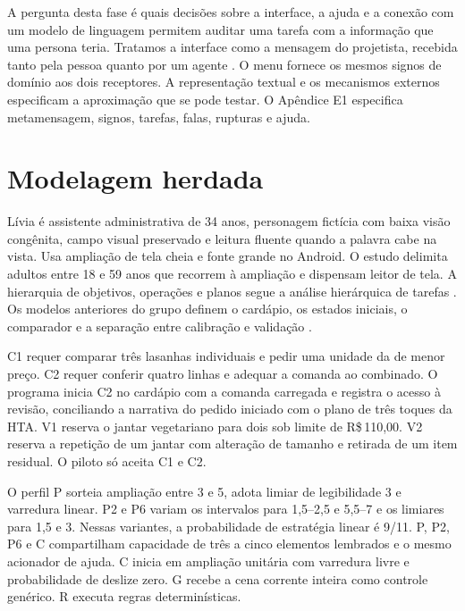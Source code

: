 A pergunta desta fase é quais decisões sobre a interface, a ajuda e a conexão com um modelo de linguagem permitem auditar uma tarefa com a informação que uma persona teria. Tratamos a interface como a mensagem do projetista, recebida tanto pela pessoa quanto por um agente \cite[p.~84]{desouza}. O menu fornece os mesmos signos de domínio aos dois receptores. A representação textual e os mecanismos externos especificam a aproximação que se pode testar. O Apêndice E1 especifica metamensagem, signos, tarefas, falas, rupturas e ajuda.

\section{Modelagem herdada}
Lívia é assistente administrativa de 34 anos, personagem fictícia com baixa visão congênita, campo visual preservado e leitura fluente quando a palavra cabe na vista. Usa ampliação de tela cheia e fonte grande no Android. O estudo delimita adultos entre 18 e 59 anos que recorrem à ampliação e dispensam leitor de tela. A hierarquia de objetivos, operações e planos segue a análise hierárquica de tarefas \cite{annett}. Os modelos anteriores do grupo definem o cardápio, os estados iniciais, o comparador e a separação entre calibração e validação \cite[apêndices B--D]{modelagem}\cite[pp.~4--9]{hts}.

C1 requer comparar três lasanhas individuais e pedir uma unidade da de menor preço. C2 requer conferir quatro linhas e adequar a comanda ao combinado. O programa inicia C2 no cardápio com a comanda carregada e registra o acesso à revisão, conciliando a narrativa do pedido iniciado com o plano de três toques da HTA. V1 reserva o jantar vegetariano para dois sob limite de R\$\,110,00. V2 reserva a repetição de um jantar com alteração de tamanho e retirada de um item residual. O piloto só aceita C1 e C2.

O perfil P sorteia ampliação entre 3 e 5, adota limiar de legibilidade 3 e varredura linear. P2 e P6 variam os intervalos para 1,5--2,5 e 5,5--7 e os limiares para 1,5 e 3. Nessas variantes, a probabilidade de estratégia linear é 9/11. P, P2, P6 e C compartilham capacidade de três a cinco elementos lembrados e o mesmo acionador de ajuda. C inicia em ampliação unitária com varredura livre e probabilidade de deslize zero. G recebe a cena corrente inteira como controle genérico. R executa regras determinísticas.

